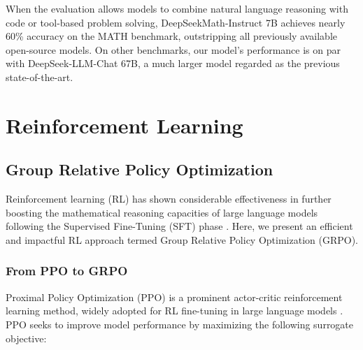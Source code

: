 When the evaluation allows models to combine natural language reasoning with code or tool-based problem solving, DeepSeekMath-Instruct 7B achieves nearly 60\% accuracy on the MATH benchmark, outstripping all previously available open-source models. On other benchmarks, our model’s performance is on par with DeepSeek-LLM-Chat 67B, a much larger model regarded as the previous state-of-the-art.

\section{Reinforcement Learning}

\subsection{Group Relative Policy Optimization} 
Reinforcement learning (RL) has shown considerable effectiveness in further boosting the mathematical reasoning capacities of large language models following the Supervised Fine-Tuning (SFT) phase \citep{wang2023math, wizardmath}. Here, we present an efficient and impactful RL approach termed Group Relative Policy Optimization (GRPO).

\subsubsection{From PPO to GRPO}
Proximal Policy Optimization (PPO) \citep{schulman2017proximal} is a prominent actor-critic reinforcement learning method, widely adopted for RL fine-tuning in large language models \citep{ouyang2022training}. PPO seeks to improve model performance by maximizing the following surrogate objective:

